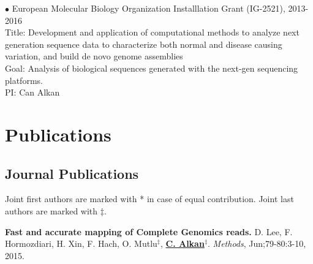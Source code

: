 \documentclass[margin,line]{res}
\newenvironment{list2}{
  \begin{list}{$\bullet$}{%
      \setlength{\itemsep}{0in}
      \setlength{\parsep}{0in} \setlength{\parskip}{0in}
      \setlength{\topsep}{0in} \setlength{\partopsep}{0in} 
      \setlength{\leftmargin}{0.2in}}}{\end{list}}
\newcommand{\junk}[1]{}
\begin{document}
\begin{resume}
\begin{list2}
                                         European Molecular Biology Organization Installlation Grant (IG-2521), 2013-2016 \\
                                         Title: Development and application of computational methods to analyze next generation sequence data to characterize both normal and disease causing variation, and build de novo genome assemblies\\
                                         Goal: Analysis of biological sequences generated with the next-gen sequencing platforms.\\
                                         PI: Can Alkan
                                       \end{list2}
                                       
                                       \section{\sc Publications}
                                       
                                       \vspace{-0.5cm}
                                       
                                       \subsection{\small \sc Journal Publications}
                                       \vspace{-0.6cm}
                                       
                                       \small{
                                         Joint first authors are marked with * in case of equal contribution. Joint last authors are marked with $\ddag$.
                                       }


\junk{
  \vspace{-.2cm}        
  {\bf Robustness of massively parallel sequencing platforms.}
  P. Kavak, B. Yüksel, S. Aksu, M.O. Kulekci, T. Güngör, F. Hach, S.C. Sahinalp, Turkish Human Genome Project, {\bf {\underline {C. Alkan}}}$^\ddag$,
  M.S. Sağıroğlu$^\ddag$.    
  {\em PLoS ONE}, 2015. 
} 

  \vspace{-.2cm}        
  {\bf Fast and accurate mapping of Complete Genomics reads.}
  D. Lee, F. Hormozdiari, H. Xin, F. Hach, O. Mutlu$^\ddag$,  {\bf {\underline {C. Alkan}}}$^\ddag$.
  {\em Methods}, Jun;79-80:3-10, 2015. 


\end{resume}
\end{document}
